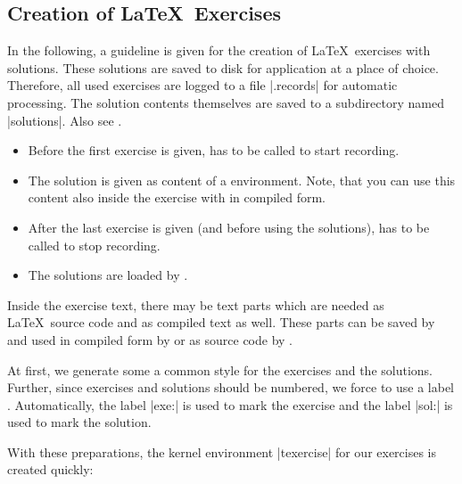 \clearpage
\subsection{Creation of \LaTeX\ Exercises}\label{listing:exercises}
In the following, a guideline is given for the creation of \LaTeX\ exercises
with solutions. These solutions are saved to disk for application at a place of
choice.
Therefore, all used exercises are logged to a file |\jobname.records| for automatic
processing. The solution contents themselves are saved to a subdirectory named
|solutions|. Also see .

\begin{itemize}
\item Before the first exercise is given,
   has to be called to start recording.
\item The solution is given as content of a 
  environment. Note, that you can use this content also inside the
  exercise with  in compiled form.
\item After the last exercise is given (and before using the solutions),
   has to be called to stop recording.
\item The solutions are loaded by .
\end{itemize}

Inside the exercise text, there may be text parts which are needed as
\LaTeX\ source code and as compiled text as well. These parts can be
saved by  and used in compiled form by 
or as source code by .

At first, we generate some a common style for the exercises and the
solutions. Further, since exercises and solutions should
be numbered, we force to use a label .
Automatically, the label |exe:| is used to mark the exercise
and the label |sol:| is used to mark the solution.

\begin{dispListing}
\end{dispListing}
\tcbusetemp

With these preparations, the kernel environment |texercise| for our
exercises is created quickly:

